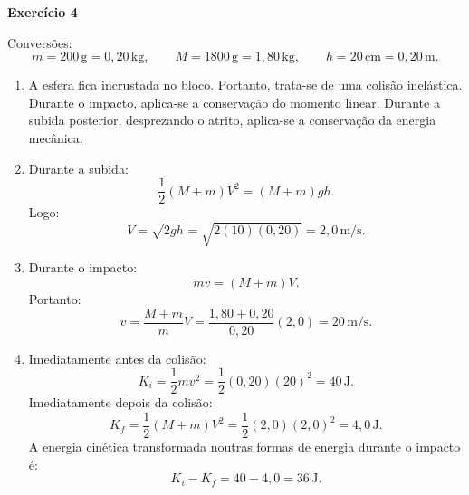 \documentclass[12pt]{article}
\begin{document}
	\vspace{0.2cm}
	
	\textbf{Exercício 4}
	
	Conversões:
	\[
	m=200\,\text{g}=0,20\,\text{kg},
	\qquad
	M=1800\,\text{g}=1,80\,\text{kg},
	\qquad
	h=20\,\text{cm}=0,20\,\text{m}.
	\]
	
	\begin{enumerate}[label=\textbf{\alph*)}]
		\item A esfera fica incrustada no bloco. Portanto, trata-se de uma colisão
		inelástica. Durante o impacto, aplica-se a conservação do momento linear. Durante
		a subida posterior, desprezando o atrito, aplica-se a conservação da energia
		mecânica.
		
		\item Durante a subida:
		\[
		\frac12(M+m)V^2=(M+m)gh.
		\]
		Logo:
		\[
		V=\sqrt{2gh}
		=\sqrt{2(10)(0,20)}
		=2,0\,\text{m/s}.
		\]
		
		\item Durante o impacto:
		\[
		mv=(M+m)V.
		\]
		Portanto:
		\[
		v=\frac{M+m}{m}V
		=\frac{1,80+0,20}{0,20}(2,0)
		=20\,\text{m/s}.
		\]
		
		\item Imediatamente antes da colisão:
		\[
		K_i=\frac12mv^2
		=\frac12(0,20)(20)^2
		=40\,\text{J}.
		\]
		Imediatamente depois da colisão:
		\[
		K_f=\frac12(M+m)V^2
		=\frac12(2,0)(2,0)^2
		=4,0\,\text{J}.
		\]
		A energia cinética transformada noutras formas de energia durante o impacto é:
		\[
		K_i-K_f=40-4,0=36\,\text{J}.
		\]
	\end{enumerate}
	
\end{document}
